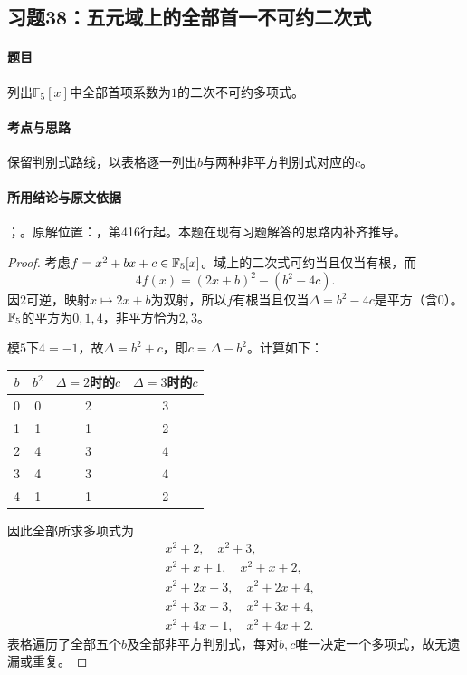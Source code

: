 \subsection{习题38：五元域上的全部首一不可约二次式}

\label{ex:3:38}

\paragraph{题目}

列出$\mathbb F_5[x]$中全部首项系数为$1$的二次不可约多项式。

\paragraph{考点与思路}

保留判别式路线，以表格逐一列出$b$与两种非平方判别式对应的$c$。

\paragraph{所用结论与原文依据}

；。原解位置：，第416行起。本题在现有习题解答的思路内补齐推导。


\begin{proof}

考虑$f=x^2+bx+c\in\mathbb F_5[x]$。域上的二次式可约当且仅当有根，而
\[
4f(x)=(2x+b)^2-(b^2-4c).
\]
因$2$可逆，映射$x\mapsto2x+b$为双射，所以$f$有根当且仅当$\Delta=b^2-4c$是平方（含$0$）。$\mathbb F_5$的平方为$0,1,4$，非平方恰为$2,3$。

模$5$下$4=-1$，故$\Delta=b^2+c$，即$c=\Delta-b^2$。计算如下：
\begin{center}\begin{tabular}{c|c|cc}
$b$&$b^2$&$\Delta=2$时的$c$&$\Delta=3$时的$c$\\\hline
0&0&2&3\\1&1&1&2\\2&4&3&4\\3&4&3&4\\4&1&1&2
\end{tabular}\end{center}
因此全部所求多项式为
\begin{align*}
&x^2+2,\quad x^2+3,\\
&x^2+x+1,\quad x^2+x+2,\\
&x^2+2x+3,\quad x^2+2x+4,\\
&x^2+3x+3,\quad x^2+3x+4,\\
&x^2+4x+1,\quad x^2+4x+2.
\end{align*}
表格遍历了全部五个$b$及全部非平方判别式，每对$b,c$唯一决定一个多项式，故无遗漏或重复。

\end{proof}

